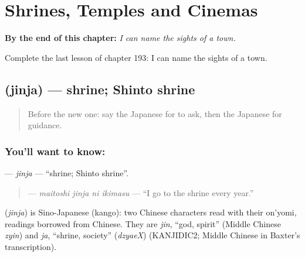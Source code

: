 
\chapter{Shrines, Temples and Cinemas}
\label{ch:ja-shrines-temples-and-cinemas}

\begin{chapteropening}
\textbf{By the end of this chapter:} \emph{I can name the sights of a town.}

Complete the last lesson of chapter 193: I can name the sights of a town.
\end{chapteropening}

\section[\texorpdfstring{\ja{じんじゃ} (jinja)}{じんじゃ (jinja)}]{ (jinja) — shrine; Shinto shrine}

\label{lesson:JA-C193-jinja}



\begin{quote}
Before the new one: say the Japanese for to ask, then the Japanese for guidance.
\end{quote}

\subsection*{You'll want to know: }
\textbf{} — \emph{jinja} — \textquotedblleft{}shrine; Shinto shrine\textquotedblright{}.

\begin{quote}
\textbf{  } — \emph{maitoshi jinja ni ikimasu} — \textquotedblleft{}I go to the shrine every year.\textquotedblright{}
\end{quote}

\begin{cousinweb}
\textbf{} (\emph{jinja}) is Sino-Japanese (kango): two Chinese characters read with their on'yomi, readings borrowed from Chinese. They are \emph{jin}, \textquotedblleft{}god, spirit\textquotedblright{} (Middle Chinese \emph{zyin}) and \emph{ja}, \textquotedblleft{}shrine, society\textquotedblright{} (\emph{dzyaeX}) (KANJIDIC2; Middle Chinese in Baxter's transcription).
\end{cousinweb}

